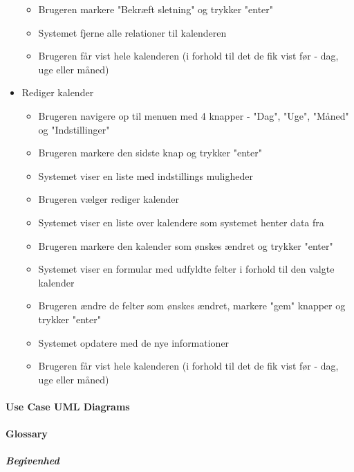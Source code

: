 \documentclass{article}
\begin{document}
\begin{itemize}
\begin{itemize}
   \item Brugeren markere "Bekræft sletning" og trykker "enter"
   \item Systemet fjerne alle relationer til kalenderen
   \item Brugeren får vist hele kalenderen (i forhold til det de fik vist før - dag, uge eller måned)
   \end{itemize}
   \item Rediger kalender
   \begin{itemize}
   \item Brugeren navigere op til menuen med 4 knapper - "Dag", "Uge", "Måned" og "Indstillinger"
   \item Brugeren markere den sidste knap og trykker "enter"
   \item Systemet viser en liste med indstillings muligheder
   \item Brugeren vælger rediger kalender
   \item Systemet viser en liste over kalendere som systemet henter data fra
   \item Brugeren markere den kalender som ønskes ændret og trykker "enter"
   \item Systemet viser en formular med udfyldte felter i forhold til den valgte kalender
   \item Brugeren ændre de felter som ønskes ændret, markere "gem" knapper og trykker "enter"
   \item Systemet opdatere med de nye informationer
   \item Brugeren får vist hele kalenderen (i forhold til det de fik vist før - dag, uge eller måned)
   \end{itemize}
   \end{itemize}
   
   \newpage 
   \paragraph{Use Case UML Diagrams} \mbox{}

   
   \begin{figure}[h]
\caption{}   
   \centering
   \end{figure}
   
   \paragraph{Glossary} \mbox{}
\subparagraph{Begivenhed} \mbox{}
\end{document}
